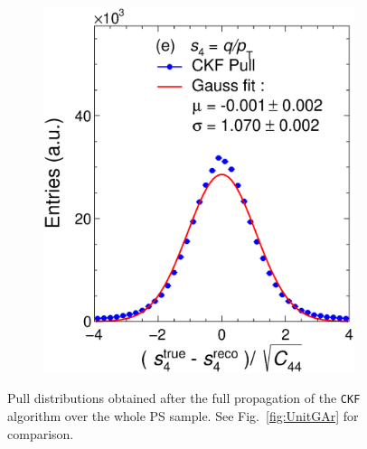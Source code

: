 \begin{figure}[!ht]
\begin{subfigure}{0.32\textwidth}
         \includegraphics[width=\textwidth]{figures/ch5-KF_NDGAr/ToySample/ParScan/UnitK_p4.eps}
         \caption{}
         \label{fig:resp4KFGAr}
     \end{subfigure}
        \caption[Pull distributions obtained after the full propagation of the \texttt{CKF} algorithm over the whole PS sample.]{Pull distributions obtained after the full propagation of the \texttt{CKF} algorithm over the whole PS sample. See Fig.~\ref{fig:UnitGAr} for comparison.}
        \label{fig:UnitGArKF}
\end{figure}

